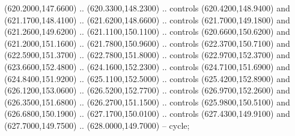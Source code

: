 {\begin{scope}[y=0.80pt, x=0.80pt, yscale=-1, xscale=1, inner sep=0pt, outer sep=0pt, #1]
      (620.2000,147.6600) .. (620.3300,148.2300) .. controls (620.4200,148.9400) and
      (621.1700,148.4100) .. (621.6200,148.6600) .. controls (621.7000,149.1800) and
      (621.2600,149.6200) .. (621.1100,150.1100) .. controls (620.6600,150.6200) and
      (621.2000,151.1600) .. (621.7800,150.9600) .. controls (622.3700,150.7100) and
      (622.5900,151.3700) .. (622.7800,151.8000) .. controls (622.9700,152.3700) and
      (623.6600,152.4800) .. (624.1600,152.2300) .. controls (624.7100,151.6900) and
      (624.8400,151.9200) .. (625.1100,152.5000) .. controls (625.4200,152.8900) and
      (626.1200,153.0600) .. (626.5200,152.7700) .. controls (626.9700,152.2600) and
      (626.3500,151.6800) .. (626.2700,151.1500) .. controls (625.9800,150.5100) and
      (626.6800,150.1900) .. (627.1700,150.0100) .. controls (627.4300,149.9100) and
      (627.7000,149.7500) .. (628.0000,149.7000) -- cycle;


\end{scope}}
